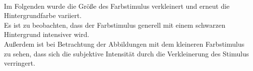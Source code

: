 \documentclass[11pt]{article}
\begin{document}
\\

Im Folgenden wurde die Größe des Farbstimulus verkleinert und erneut die Hintergrundfarbe variiert. \\

Es ist zu beobachten, dass der Farbstimulus generell mit einem schwarzen Hintergrund intensiver wird. \\
Außerdem ist bei Betrachtung der Abbildungen mit dem kleineren Farbstimulus zu sehen, dass sich die subjektive Intensität durch die Verkleinerung des Stimulus verringert. 
\end{document}
